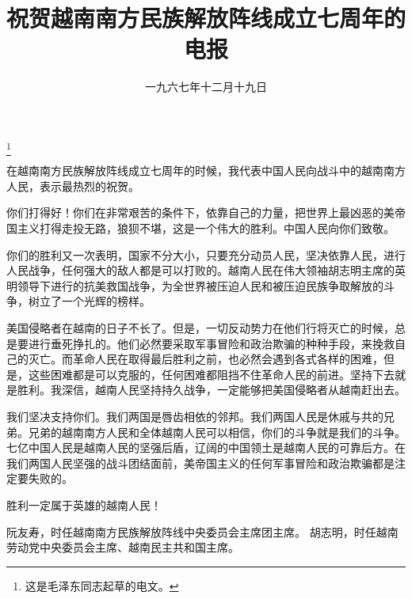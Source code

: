 
\title{祝贺越南南方民族解放阵线成立七周年的电报}
\date{一九六七年十二月十九日}
\thanks{这是毛泽东同志起草的电文。}
\maketitle



在越南南方民族解放阵线成立七周年的时候，我代表中国人民向战斗中的越南南方人民，表示最热烈的祝贺。

你们打得好！你们在非常艰苦的条件下，依靠自己的力量，把世界上最凶恶的美帝国主义打得走投无路，狼狈不堪，这是一个伟大的胜利。中国人民向你们致敬。

你们的胜利又一次表明，国家不分大小，只要充分动员人民，坚决依靠人民，进行人民战争，任何强大的敌人都是可以打败的。越南人民在伟大领袖胡志明主席的英明领导下进行的抗美救国战争，为全世界被压迫人民和被压迫民族争取解放的斗争，树立了一个光辉的榜样。

美国侵略者在越南的日子不长了。但是，一切反动势力在他们行将灭亡的时候，总是要进行垂死挣扎的。他们必然要采取军事冒险和政治欺骗的种种手段，来挽救自己的灭亡。而革命人民在取得最后胜利之前，也必然会遇到各式各样的困难，但是，这些困难都是可以克服的，任何困难都阻挡不住革命人民的前进。坚持下去就是胜利。我深信，越南人民坚持持久战争，一定能够把美国侵略者从越南赶出去。

我们坚决支持你们。我们两国是唇齿相依的邻邦。我们两国人民是休戚与共的兄弟。兄弟的越南南方人民和全体越南人民可以相信，你们的斗争就是我们的斗争。七亿中国人民是越南人民的坚强后盾，辽阔的中国领土是越南人民的可靠后方。在我们两国人民坚强的战斗团结面前，美帝国主义的任何军事冒险和政治欺骗都是注定要失败的。

胜利一定属于英雄的越南人民！

\begin{maonote}
阮友寿，时任越南南方民族解放阵线中央委员会主席团主席。
胡志明，时任越南劳动党中央委员会主席、越南民主共和国主席。
\end{maonote}
